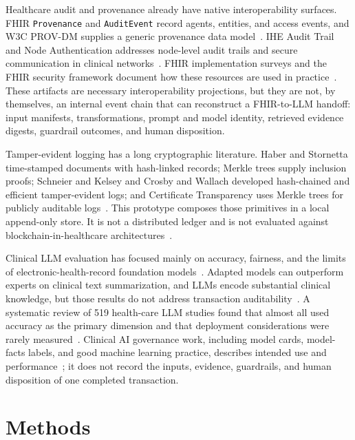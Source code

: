\documentclass[preprint,review,12pt]{elsarticle}
\begin{document}
Healthcare audit and provenance already have native interoperability
surfaces. FHIR \texttt{Provenance} and \texttt{AuditEvent} record agents,
entities, and access events, and W3C PROV-DM supplies a generic provenance
data model~\cite{hl7provenance,hl7auditevent,provdm}. IHE Audit Trail and Node
Authentication addresses node-level audit trails and secure communication in
clinical networks~\cite{ihe-atna}. FHIR implementation surveys and the FHIR
security framework document how these resources are used in
practice~\cite{ayaz2021fhir,hl7security}. These artifacts are necessary
interoperability projections, but they are not, by themselves, an internal
event chain that can reconstruct a FHIR-to-LLM handoff: input manifests,
transformations, prompt and model identity, retrieved evidence digests,
guardrail outcomes, and human disposition.

Tamper-evident logging has a long cryptographic literature. Haber and
Stornetta time-stamped documents with hash-linked records; Merkle trees supply
inclusion proofs; Schneier and Kelsey and Crosby and Wallach developed
hash-chained and efficient tamper-evident logs; and Certificate Transparency
uses Merkle trees for publicly auditable
logs~\cite{haber1991timestamp,merkle1988signature,schneier1998logs,crosby2009tamper,rfc6962}.
This prototype composes those primitives in a local append-only store. It is
not a distributed ledger and is not evaluated against blockchain-in-healthcare
architectures~\cite{agbo2019blockchain}.

Clinical LLM evaluation has focused mainly on accuracy, fairness, and the
limits of electronic-health-record foundation
models~\cite{wornow2023shaky,bedi2025testing}. Adapted models can outperform
experts on clinical text summarization, and LLMs encode substantial clinical
knowledge, but those results do not address transaction
auditability~\cite{vanveen2024adapted,singhal2023medpalm}. A systematic review
of 519 health-care LLM studies found that almost all used accuracy as the
primary dimension and that deployment considerations were rarely
measured~\cite{bedi2025testing}. Clinical AI governance work, including model
cards, model-facts labels, and good machine learning practice, describes
intended use and performance~\cite{mitchell2019modelcards,sendak2020modelfacts,fda2021gmlp};
it does not record the inputs, evidence, guardrails, and human disposition of
one completed transaction.

\section{Methods}
\label{sec:method}
\end{document}
